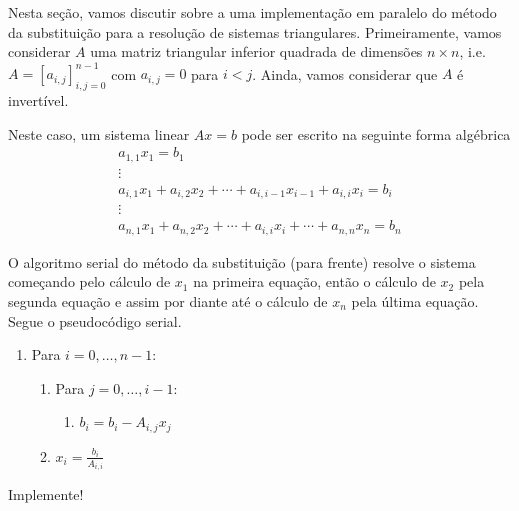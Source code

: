Nesta seção, vamos discutir sobre a uma implementação em paralelo do método da substituição para a resolução de sistemas triangulares. Primeiramente, vamos considerar $A$ uma matriz triangular inferior quadrada de dimensões $n\times n$, i.e. $A=[a_{i,j}]_{i,j=0}^{n-1}$ com $a_{i,j}=0$ para $i<j$. Ainda, vamos considerar que $A$ é invertível.

Neste caso, um sistema linear $Ax = b$ pode ser escrito na seguinte forma algébrica
\begin{gather}
  a_{1,1}x_1 = b_1\\
             \vdots \\
  a_{i,1}x_1 + a_{i,2}x_2 + \cdots + a_{i,i-1}x_{i-1} + a_{i,i}x_{i} = b_i \\
             \vdots\\
  a_{n,1}x_1 + a_{n,2}x_2 + \cdots + a_{i,i}x_i + \cdots + a_{n,n}x_{n} = b_n               
\end{gather}

O algoritmo serial do método da substituição (para frente) resolve o sistema começando pelo cálculo de $x_1$ na primeira equação, então o cálculo de $x_2$ pela segunda equação e assim por diante até o cálculo de $x_n$ pela última equação. Segue o pseudocódigo serial.
\begin{enumerate}
\item Para $i = 0, \dotsc, n-1$:
  \begin{enumerate}
  \item Para $j = 0, \dotsc, i-1$:
    \begin{enumerate}
    \item $b_i = b_i - A_{i,j}x_j$
    \end{enumerate}
  \item $\displaystyle x_i = \frac{b_i}{A_{i,i}}$
  \end{enumerate}
\end{enumerate}
Implemente!

